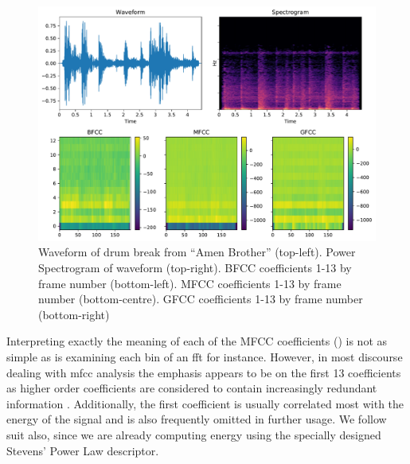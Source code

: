 {{\begin{figure}
	\begin{center}
		\includegraphics[scale=0.70]{ch05_pyconcat/figures/wave_spec_mfcc_bfcc.pdf}		
		\end{center}
		\caption[Waveform, Spectrogram, BFCC, MFCC and GFCC impressions of the ``Amen Break'' drum solo from ``Amen Brother'']{Waveform of drum break from ``Amen Brother'' (top-left). Power Spectrogram of waveform (top-right). BFCC coefficients 1-13 by frame number (bottom-left). MFCC coefficients 1-13 by frame number (bottom-centre). GFCC coefficients 1-13 by frame number (bottom-right)}
	\label{fig:bfcc_mfcc_gfcc_compared}
\end{figure}



Interpreting exactly the meaning of each of the MFCC coefficients () is not as simple as is examining each bin of an \acrshort{fft} for instance. However, in most discourse dealing with \acrshort{mfcc} analysis the emphasis appears to be on the first 13 coefficients as higher order coefficients are considered to contain increasingly redundant information \citep{Logan2000}. Additionally, the first coefficient is usually correlated most with the energy of the signal and is also frequently omitted in further usage.  We follow suit also, since we are already computing energy using the specially designed Stevens' Power Law descriptor.

}}

